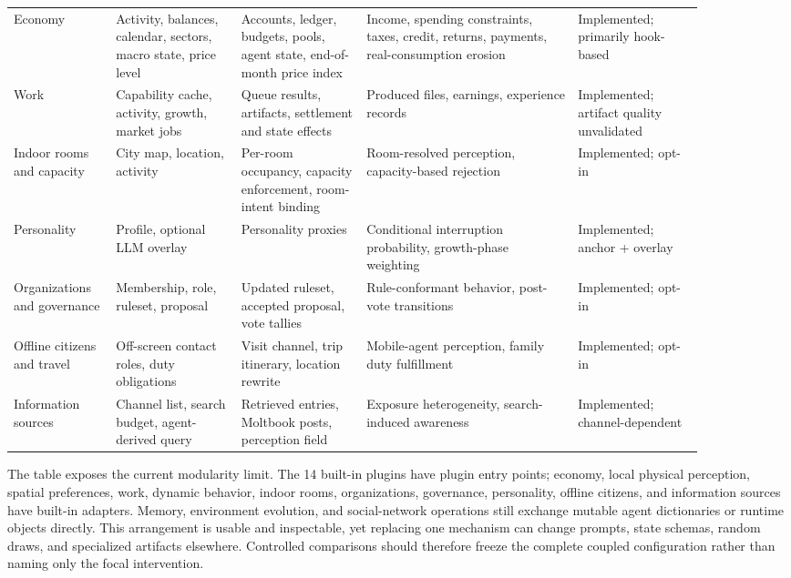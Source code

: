 \begin{table}[t]
\begin{tabular}{@{}p{0.13\linewidth}p{0.16\linewidth}p{0.16\linewidth}p{0.27\linewidth}p{0.16\linewidth}@{}}
Economy & Activity, balances, calendar, sectors, macro state, price level & Accounts, ledger, budgets, pools, agent state, end-of-month price index & Income, spending constraints, taxes, credit, returns, payments, real-consumption erosion & Implemented; primarily hook-based \\
Work & Capability cache, activity, growth, market jobs & Queue results, artifacts, settlement and state effects & Produced files, earnings, experience records & Implemented; artifact quality unvalidated \\
Indoor rooms and capacity & City map, location, activity & Per-room occupancy, capacity enforcement, room-intent binding & Room-resolved perception, capacity-based rejection & Implemented; opt-in \\
Personality & Profile, optional LLM overlay & Personality proxies & Conditional interruption probability, growth-phase weighting & Implemented; anchor + overlay \\
Organizations and governance & Membership, role, ruleset, proposal & Updated ruleset, accepted proposal, vote tallies & Rule-conformant behavior, post-vote transitions & Implemented; opt-in \\
Offline citizens and travel & Off-screen contact roles, duty obligations & Visit channel, trip itinerary, location rewrite & Mobile-agent perception, family duty fulfillment & Implemented; opt-in \\
Information sources & Channel list, search budget, agent-derived query & Retrieved entries, Moltbook posts, perception field & Exposure heterogeneity, search-induced awareness & Implemented; channel-dependent \\
\bottomrule
\end{tabular}
\end{table}

The table exposes the current modularity limit.  The 14 built-in plugins
have plugin entry points; economy, local physical perception, spatial
preferences, work, dynamic behavior, indoor rooms, organizations,
governance, personality, offline citizens, and information sources have
built-in adapters.  Memory, environment evolution, and social-network
operations still exchange mutable agent dictionaries or runtime objects
directly.  This arrangement is usable and inspectable, yet replacing one
mechanism can change prompts, state schemas, random draws, and specialized
artifacts elsewhere.  Controlled comparisons should therefore freeze the
complete coupled configuration rather than naming only the focal
intervention.
